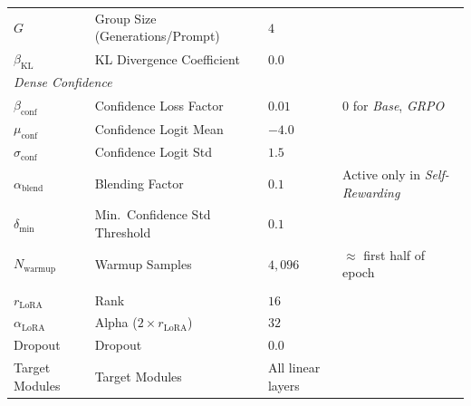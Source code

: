 \documentclass[a4paper,oneside,10pt,ngerman,english]{scrartcl}
\begin{document}
\begin{landscape}
\begin{longtable}{llll}
		$G$                       & Group Size (Generations/Prompt)        & $4$                                 &                                           \\
		$\beta_{\mathrm{KL}}$     & KL Divergence Coefficient              & $0.0$                               &                                           \\
		\midrule
		\multicolumn{4}{l}{\textit{Dense Confidence}}                                                                                                        \\
		$\beta_{\mathrm{conf}}$   & Confidence Loss Factor                 & $0.01$                              & $0$ for \textit{Base}, \textit{GRPO}      \\
		$\mu_{\mathrm{conf}}$     & Confidence Logit Mean                  & $-4.0$                              &                                           \\
		$\sigma_{\mathrm{conf}}$  & Confidence Logit Std                   & $1.5$                               &                                           \\
		$\alpha_{\mathrm{blend}}$ & Blending Factor                        & $0.1$                               & Active only in \textit{Self-Rewarding}    \\
		$\delta_{\mathrm{min}}$   & Min.\ Confidence Std Threshold         & $0.1$                               &                                           \\
		$N_{\mathrm{warmup}}$     & Warmup Samples                         & $4{,}096$                           & $\approx$ first half of epoch             \\
		\pagebreak
		\multicolumn{4}{l}{\textit{LoRA}}                                                                                                                    \\
		$r_{\mathrm{LoRA}}$       & Rank                                   & $16$                                &                                           \\
		$\alpha_{\mathrm{LoRA}}$  & Alpha ($2 \times r_{\mathrm{LoRA}}$)   & $32$                                &                                           \\
		Dropout                   & Dropout                                & $0.0$                               &                                           \\
		Target Modules            & Target Modules                         & All linear layers                   &                                           \\

\end{longtable}
\end{landscape}
\end{document}
